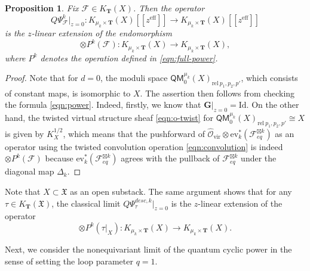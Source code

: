 \documentclass[reqno]{amsart}
\numberwithin{equation}{section}
\numberwithin{equation}{section}
\numberwithin{equation}{section}
\newtheorem{prop}[thm]{Proposition}
\theoremstyle{definition}
\theoremstyle{remark}
\theoremstyle{remark}
\begin{document}
\begin{prop}\label{prop:cyclic-classical-limit}
    Fix $\mathcal{F} \in K_{\mathbf{T}}(X)$. Then the operator
    \begin{equation}
        Q\Psi_{\mathcal{F}}^k |_{z=0}: K_{\mu_k \times \mathbf{T}}(X)[\![ z^{\mathrm{eff}} ]\!] \to K_{\mu_k \times \mathbf{T}}(X)[\![ z^{\mathrm{eff}} ]\!]
    \end{equation}
    is the $z$-linear extension of the endomorphism
    \begin{equation}
        \otimes P^k(\mathcal{F}): K_{\mu_k \times \mathbf{T}}(X) \to K_{\mu_k \times \mathbf{T}}(X),
    \end{equation}
    where $P^k$ denotes the operation defined in \eqref{eqn:full-power}.
\end{prop}
\begin{proof}
    Note that for $d=0$, the moduli space $\mathsf{QM}_0^{\mu_k}(X)_{\mathrm{rel} \  p_1,p_2, p'}$, which consists of constant maps, is isomorphic to $X$. The assertion then follows from checking the formula \eqref{eqn:power}. Indeed, firstly, we know that $\mathbf{G}|_{z=0} = \mathrm{Id}$. On the other hand, the twisted virtual structure sheaf \eqref{eqn:o-twist} for $\mathsf{QM}_0^{\mu_k}(X)_{\mathrm{rel} \  p_1,p_2, p'} \cong X$ is given by $K_X^{1/2}$, which means that the pushforward of $\hat{\mathcal{O}}_{\mathrm{vir}} \otimes \mathrm{ev}_k^*(\mathcal{F}^{\boxtimes k}_{eq})$ as an operator using the twisted convolution operation \eqref{eqn:convolution} is indeed $\otimes P^k(\mathcal{F})$ because $\mathrm{ev}_k^*(\mathcal{F}^{\boxtimes k}_{eq})$ agrees with the pullback of $\mathcal{F}^{\boxtimes k}_{eq}$ under the diagonal map $\Delta_k$.
\end{proof}

Note that $X \subset \mathfrak{X}$ as an open substack. The same argument shows that for any $\tau \in K_{\mathbf{T}}(\mathfrak{X})$, the classical limit $Q\Psi^{desc, k}_\tau |_{z=0}$ is the $z$-linear extension of the operator
\begin{equation}
    \otimes P^k(\tau|_{X}): K_{\mu_k \times \mathbf{T}}(X) \to K_{\mu_k \times \mathbf{T}}(X).
\end{equation}

Next, we consider the nonequivariant limit of the quantum cyclic power in the sense of setting the loop parameter $q=1$.
\end{document}
